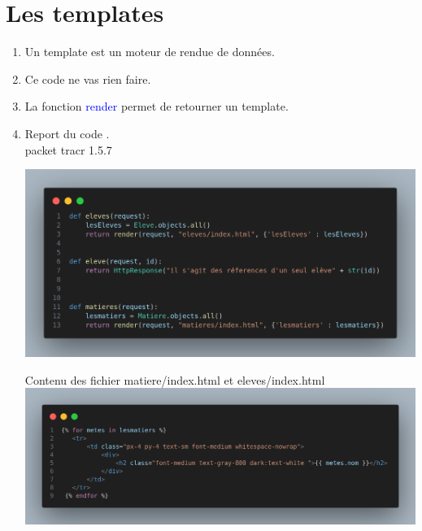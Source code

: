\documentclass[10pt,a4paper]{article}
\begin{document}
\section{Les templates}
\begin{enumerate}
\item Un template est un moteur de rendue de données.
\item Ce code ne vas rien faire.
\item La fonction \textcolor{blue}{render} permet de retourner un template. 

\item Report du code .\\packet tracr 1.5.7
\begin{center}
\includegraphics[scale=0.23]{4.png}
\end{center}

Contenu des fichier matiere/index.html et eleves/index.html\\

\includegraphics[scale=0.21]{5.png}
\end{enumerate}
\end{document}
